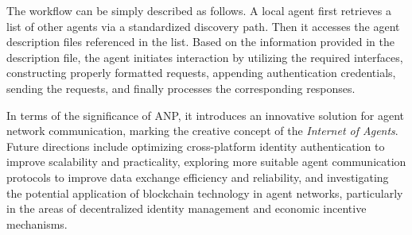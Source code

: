 \documentclass[10pt,preprint]{article}
\begin{document}
The workflow can be simply described as follows. A local agent first retrieves a list of other agents via a standardized discovery path. Then it accesses the agent description files referenced in the list. Based on the information provided in the description file, the agent initiates interaction by utilizing the required interfaces, constructing properly formatted requests, appending authentication credentials, sending the requests, and finally processes the corresponding responses.

In terms of the significance of ANP, it introduces an innovative solution for agent network communication, marking the creative concept of the \textit{Internet of Agents}. Future directions include optimizing cross-platform identity authentication to improve scalability and practicality, exploring more suitable agent communication protocols to improve data exchange efficiency and reliability, and investigating the potential application of blockchain technology in agent networks, particularly in the areas of decentralized identity management and economic incentive mechanisms.
\end{document}

